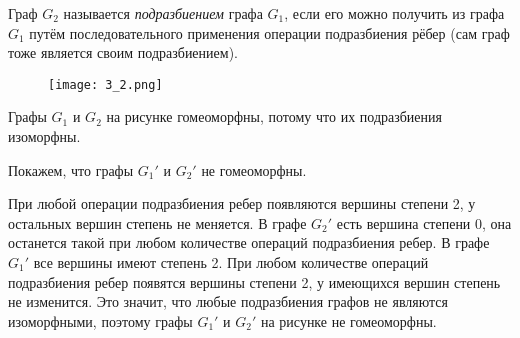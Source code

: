 \begin{definition}
    Граф $G_2$ называется \textit{подразбиением} графа $G_1$, если его можно
    получить из графа $G_1$ путём последовательного применения операции
    подразбиения рёбер (сам граф тоже является своим подразбиением).
\end{definition}

\begin{figure}[h]
    \centering
    \texttt{[image: 3\_2.png]}
\end{figure}

Графы $G_1$ и $G_2$ на рисунке гомеоморфны, потому что их подразбиения
изоморфны.

Покажем, что графы ${G_1}'$ и ${G_2}'$ не гомеоморфны.

При любой операции подразбиения ребер появляются вершины степени 2, у
остальных вершин степень не меняется. В графе ${G_2}'$ есть вершина степени 0,
она останется такой при любом количестве операций подразбиения ребер. В
графе ${G_1}'$ все вершины имеют степень 2. При любом количестве операций
подразбиения ребер появятся вершины степени 2, у имеющихся вершин
степень не изменится. Это значит, что любые подразбиения графов не
являются изоморфными, поэтому графы ${G_1}'$ и ${G_2}'$ на рисунке не
гомеоморфны.